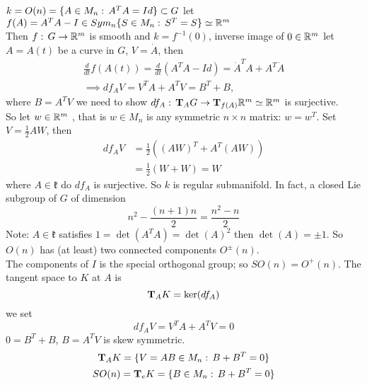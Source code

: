 \begin{examples}
$k=O(n) = \{A\in M_n :\, A^TA=Id\} \subset G$ let $f(A)=A^TA-I \in Sym_n\{S\in M_n:\, S^T=S\} \simeq \mathbb{R}^m$\\
Then $f:\, G\to \mathbb{R}^m$ is smooth and $k=f^{-1}(0)$, inverse image of $0\in \mathbb{R}^m$ let $A=A(t)$ be a curve in $G$, $V=\dot A$, then
\begin{gather*}
\frac{d}{dt} f(A(t)) = \frac{d}{dt}(A^TA - Id) = \dot A^TA + A^T \dot A\\
\implies df_AV = V^TA + A^TV = B^T + B,
\end{gather*}
where $B=A^TV$ we need to show $df_A:\, \text{\textbf{T}}_AG \to \text{\textbf{T}}_{f(A)} \mathbb{R}^m \simeq \mathbb{R}^m$ is surjective.\\
So let $w\in \mathbb{R}^m$ , that is $w\in M_n$ is any symmetric $n\times n$ matrix: $w=w^T$. Set $V=\frac{1}{2}AW$, then 
\begin{align*}
df_AV &= \frac{1}{2}((AW)^T + A^T(AW))\\
      &= \frac{1}{2}(W+W) = W
\end{align*}
where $A\in \mathfrak{k}$ do $df_A$ is surjective. So $k$ is regular submanifold. In fact, a closed Lie subgroup of $G$ of dimension 
$$n^2 - \frac{(n+1)n}{2} = \frac{n^2-n}{2}$$
Note: $A\in\mathfrak{k}$ satisfies $1=\det(A^TA) = \det(A)^2$ then $\det(A) = \pm1$. So $O(n)$ has (at least) two connected components $O^\pm (n)$.\\
The components of $I$ is the special orthogonal group; so $SO(n)  = O^+(n)$. The tangent space to $K$ at $A$ is $$\text{\textbf{T}}_AK = \ker(df_A)$$
we set 
$$df_AV = V^TA + A^TV = 0$$
$0=B^T + B$, $B=A^TV$ is skew symmetric.
\begin{gather*}
\text{\textbf{T}}_AK = \{V=AB\in M_n :\, B+B^T =0 \}\\
SO(n) = \text{\textbf{T}}_eK = \{B\in M_n :\, B+B^T  =0 \}
\end{gather*}
\end{examples}

